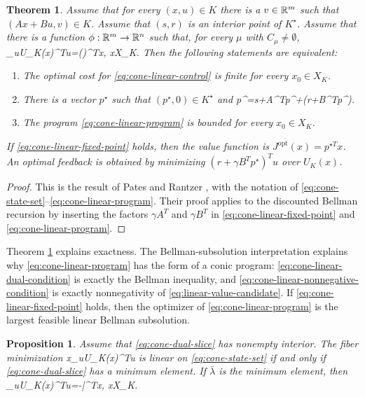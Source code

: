 \documentclass{article}
\newtheorem{theorem}{Theorem}
\newtheorem{proposition}{Proposition}
\begin{document}
\begin{theorem}
\label{thm:pates-rantzer-cone}
Assume that for every $(x,u)\in K$ there is a $v\in\mathbb{R}^m$ such that $(Ax+Bu,v)\in K$. Assume that $(s,r)$ is an interior point of $K^\star$. Assume that there is a function $\phi:\mathbb{R}^m\rightarrow\mathbb{R}^n$ such that, for every $\mu$ with $C_\mu\neq\emptyset$,
\BEQ
\inf_{u\in U_K(x)}\mu^Tu=\phi(\mu)^Tx,
\quad x\in X_K.
\label{eq:fiber-linearity}
\EEQ
Then the following statements are equivalent:
\begin{enumerate}
\item The optimal cost for \eqref{eq:cone-linear-control} is finite for every $x_0\in X_K$.
\item There is a vector $p^\star$ such that $(p^\star,0)\in K^\star$ and
\BEQ
p^\star=s+\gamma A^Tp^\star+\phi(r+\gamma B^Tp^\star).
\label{eq:cone-linear-fixed-point}
\EEQ
\item The program \eqref{eq:cone-linear-program} is bounded for every $x_0\in X_K$.
\end{enumerate}
If \eqref{eq:cone-linear-fixed-point} holds, then the value function is $J^\textrm{opt}(x)=p^{\star T}x$. An optimal feedback is obtained by minimizing $(r+\gamma B^Tp^\star)^Tu$ over $U_K(x)$.
\end{theorem}

\begin{proof}
This is the result of Pates and Rantzer \cite{pates-rantzer-cdc}, with the notation of \eqref{eq:cone-state-set}--\eqref{eq:cone-linear-program}. Their proof applies to the discounted Bellman recursion by inserting the factors $\gamma A^T$ and $\gamma B^T$ in \eqref{eq:cone-linear-fixed-point} and \eqref{eq:cone-linear-program}.
\end{proof}

Theorem \ref{thm:pates-rantzer-cone} explains exactness. The Bellman-subsolution interpretation explains why \eqref{eq:cone-linear-program} has the form of a conic program: \eqref{eq:cone-linear-dual-condition} is exactly the Bellman inequality, and \eqref{eq:cone-linear-nonnegative-condition} is exactly nonnegativity of \eqref{eq:linear-value-candidate}. If \eqref{eq:cone-linear-fixed-point} holds, then the optimizer of \eqref{eq:cone-linear-program} is the largest feasible linear Bellman subsolution.

\begin{proposition}
\label{prop:pates-rantzer-dual-slice}
Assume that \eqref{eq:cone-dual-slice} has nonempty interior. The fiber minimization
\BEQ
x\mapsto \inf_{u\in U_K(x)}\mu^Tu
\label{eq:cone-fiber-map}
\EEQ
is linear on \eqref{eq:cone-state-set} if and only if \eqref{eq:cone-dual-slice} has a minimum element. If $\bar\lambda$ is the minimum element, then
\BEQ
\inf_{u\in U_K(x)}\mu^Tu=-\bar\lambda^Tx,
\quad x\in X_K.
\label{eq:cone-fiber-minimum-element}
\EEQ
\end{proposition}
\end{document}
